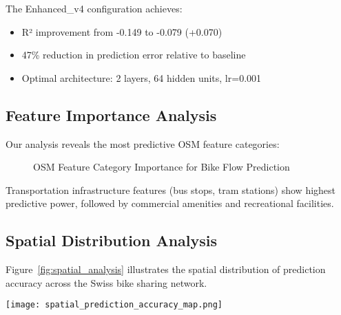 \documentclass[twocolumn,11pt]{IEEEtran}  %
\begin{document}
The Enhanced\_v4 configuration achieves:
\begin{itemize}
\item R² improvement from -0.149 to -0.079 (+0.070)
\item 47\% reduction in prediction error relative to baseline
\item Optimal architecture: 2 layers, 64 hidden units, lr=0.001
\end{itemize}

\subsection{Feature Importance Analysis}

Our analysis reveals the most predictive OSM feature categories:

\begin{figure}[h!]
\centering
{}
\caption{OSM Feature Category Importance for Bike Flow Prediction}
\label{fig:feature_importance}
\end{figure}

Transportation infrastructure features (bus stops, tram stations) show highest predictive power, followed by commercial amenities and recreational facilities.

\subsection{Spatial Distribution Analysis}

Figure~\ref{fig:spatial_analysis} illustrates the spatial distribution of prediction accuracy across the Swiss bike sharing network.

\begin{figure*}[h!]
\centering
\texttt{[image: spatial\_prediction\_accuracy\_map.png]}
\caption{Spatial Distribution of Bike Flow Prediction Accuracy Across Swiss Stations. Darker colors indicate higher prediction accuracy. Urban centers show consistently better performance due to higher feature density and more predictable usage patterns.}
\label{fig:spatial_analysis}
\end{figure*}
\end{document}

